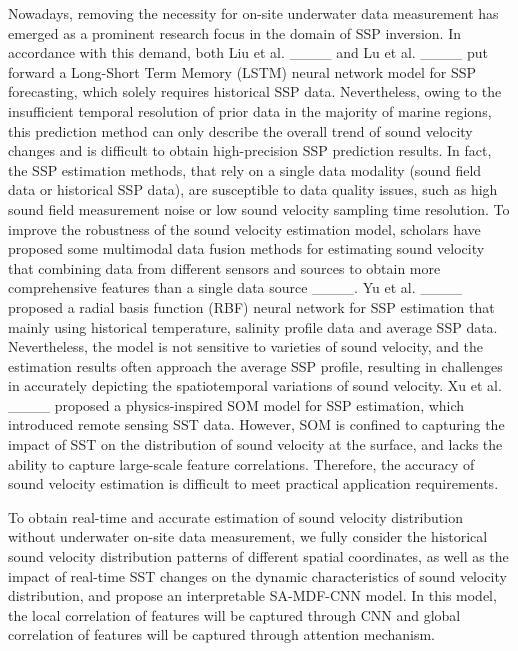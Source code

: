 Nowadays, removing the necessity for on-site underwater data measurement has emerged as a prominent research focus in the domain of SSP inversion. In accordance with this demand, both Liu et al. ____ and Lu et al. ____ put forward a Long-Short Term Memory (LSTM) neural network model for SSP forecasting, which solely requires historical SSP data. Nevertheless, owing to the insufficient temporal resolution of prior data in the majority of marine regions, this prediction method can only describe the overall trend of sound velocity changes and is difficult to obtain high-precision SSP prediction results. In fact, the SSP estimation methods, that rely on a single data modality (sound field data or historical SSP data), are susceptible to data quality issues, such as high sound field measurement noise or low sound velocity sampling time resolution. To improve the robustness of the sound velocity estimation model, scholars have proposed some multimodal data fusion methods for estimating sound velocity that combining data from different sensors and sources to obtain more comprehensive features than a single data source ____. Yu et al. ____ proposed a radial basis function (RBF) neural network for SSP estimation that mainly using historical temperature, salinity profile data and average SSP data. Nevertheless, the model is not sensitive to varieties of sound velocity, and the estimation results often approach the average SSP profile, resulting in challenges in accurately depicting the spatiotemporal variations of sound velocity. Xu et al. ____ proposed a physics-inspired SOM model for SSP estimation, which introduced remote sensing SST data. However, SOM is confined to capturing the impact of SST on the distribution of sound velocity at the surface, and lacks the ability to capture large-scale feature correlations. Therefore, the accuracy of sound velocity estimation is difficult to meet practical application requirements.

To obtain real-time and accurate estimation of sound velocity distribution without underwater on-site data measurement, we fully consider the historical sound velocity distribution patterns of different spatial coordinates, as well as the impact of real-time SST changes on the dynamic characteristics of sound velocity distribution, and propose an interpretable SA-MDF-CNN model. In this model, the local correlation of features will be captured through CNN and global correlation of features will be captured through attention mechanism.